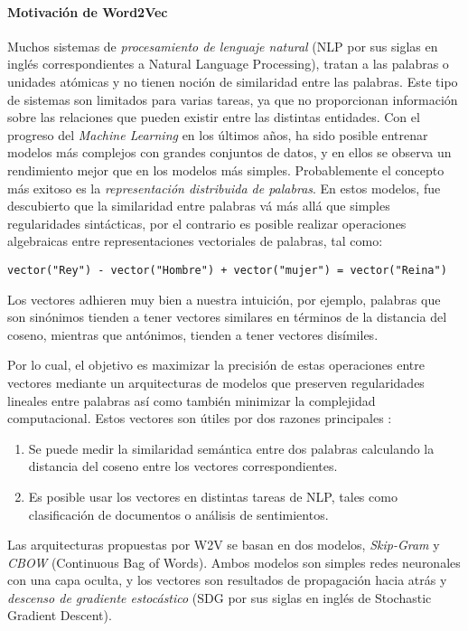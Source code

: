 \paragraph{Motivación de Word2Vec}
Muchos sistemas de \textit{procesamiento de lenguaje natural} (NLP por sus siglas en inglés correspondientes a Natural Language Processing), tratan a las palabras o unidades atómicas y no tienen noción de similaridad entre las palabras. Este tipo de sistemas son limitados para varias tareas, ya que no proporcionan información sobre las relaciones que pueden existir entre las distintas entidades. Con el progreso del \textit{Machine Learning} en los últimos años, ha sido posible entrenar modelos más complejos con grandes conjuntos de datos, y en ellos se observa un rendimiento mejor que en los modelos más simples. Probablemente el concepto más exitoso es la \textit{representación distribuida de palabras}. En estos modelos, fue descubierto que la similaridad entre palabras vá más allá que simples regularidades sintácticas, por el contrario es posible realizar operaciones algebraicas entre representaciones vectoriales de palabras, tal como:

\begin{verbatim}
vector("Rey") - vector("Hombre") + vector("mujer") = vector("Reina")
\end{verbatim}

Los vectores adhieren muy bien a nuestra intuición, por ejemplo, palabras que son sinónimos tienden a tener vectores similares en términos de la distancia del coseno, mientras que antónimos, tienden a tener vectores disímiles.

\bigskip Por lo cual, el objetivo es maximizar la precisión de estas operaciones entre vectores mediante un arquitecturas de modelos que preserven regularidades lineales entre palabras así como también minimizar la complejidad computacional. Estos vectores son útiles por dos razones principales \citep{mccormick2016word2vec}:

\begin{enumerate}
	\item Se puede medir la similaridad semántica entre dos palabras calculando la distancia del coseno entre los vectores correspondientes.
	\item Es posible usar los vectores en distintas tareas de NLP, tales como clasificación de documentos o análisis de sentimientos.
\end{enumerate}

\bigskip Las arquitecturas propuestas por W2V se basan en dos modelos, \textit{Skip-Gram} y \textit{CBOW} (Continuous Bag of Words). Ambos modelos son simples redes neuronales con una capa oculta, y los vectores son resultados de propagación hacia atrás y \textit{descenso de gradiente estocástico} (SDG por sus siglas en inglés de Stochastic Gradient Descent).


